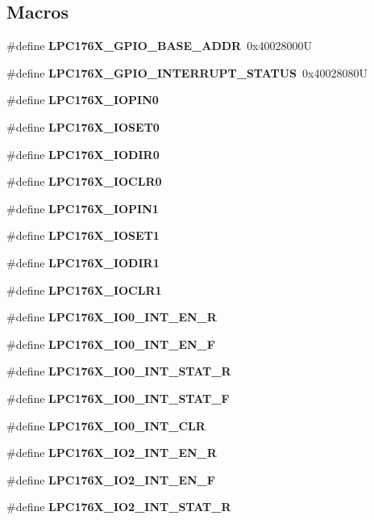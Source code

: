 \subsection*{Macros}
\begin{DoxyCompactItemize}
\item 
\mbox{\label{gpio-defs_8h_a4d1127979acf1bfc73c1ff6b4c63d2ed}} 
\#define {\bfseries L\+P\+C176\+X\+\_\+\+G\+P\+I\+O\+\_\+\+B\+A\+S\+E\+\_\+\+A\+D\+DR}~0x40028000U
\item 
\mbox{\label{gpio-defs_8h_ae1d252960d1d34b49bfc9b3b4886e6f5}} 
\#define {\bfseries L\+P\+C176\+X\+\_\+\+G\+P\+I\+O\+\_\+\+I\+N\+T\+E\+R\+R\+U\+P\+T\+\_\+\+S\+T\+A\+T\+US}~0x40028080U
\item 
\#define {\bfseries L\+P\+C176\+X\+\_\+\+I\+O\+P\+I\+N0}
\item 
\#define {\bfseries L\+P\+C176\+X\+\_\+\+I\+O\+S\+E\+T0}
\item 
\#define {\bfseries L\+P\+C176\+X\+\_\+\+I\+O\+D\+I\+R0}
\item 
\#define {\bfseries L\+P\+C176\+X\+\_\+\+I\+O\+C\+L\+R0}
\item 
\#define {\bfseries L\+P\+C176\+X\+\_\+\+I\+O\+P\+I\+N1}
\item 
\#define {\bfseries L\+P\+C176\+X\+\_\+\+I\+O\+S\+E\+T1}
\item 
\#define {\bfseries L\+P\+C176\+X\+\_\+\+I\+O\+D\+I\+R1}
\item 
\#define {\bfseries L\+P\+C176\+X\+\_\+\+I\+O\+C\+L\+R1}
\item 
\#define {\bfseries L\+P\+C176\+X\+\_\+\+I\+O0\+\_\+\+I\+N\+T\+\_\+\+E\+N\+\_\+R}
\item 
\#define {\bfseries L\+P\+C176\+X\+\_\+\+I\+O0\+\_\+\+I\+N\+T\+\_\+\+E\+N\+\_\+F}
\item 
\#define {\bfseries L\+P\+C176\+X\+\_\+\+I\+O0\+\_\+\+I\+N\+T\+\_\+\+S\+T\+A\+T\+\_\+R}
\item 
\#define {\bfseries L\+P\+C176\+X\+\_\+\+I\+O0\+\_\+\+I\+N\+T\+\_\+\+S\+T\+A\+T\+\_\+F}
\item 
\#define {\bfseries L\+P\+C176\+X\+\_\+\+I\+O0\+\_\+\+I\+N\+T\+\_\+\+C\+LR}
\item 
\#define {\bfseries L\+P\+C176\+X\+\_\+\+I\+O2\+\_\+\+I\+N\+T\+\_\+\+E\+N\+\_\+R}
\item 
\#define {\bfseries L\+P\+C176\+X\+\_\+\+I\+O2\+\_\+\+I\+N\+T\+\_\+\+E\+N\+\_\+F}
\item 
\#define {\bfseries L\+P\+C176\+X\+\_\+\+I\+O2\+\_\+\+I\+N\+T\+\_\+\+S\+T\+A\+T\+\_\+R}

\end{DoxyCompactItemize}
